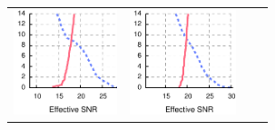 \begin{figure}[p]
\begin{xtrafullpage}
\begin{tabular}{cccc}
	\includegraphics[height=1.2in]{figures/delivery_figures/goodbad/esnr_goodbad_14.pdf} &
	\includegraphics[height=1.2in]{figures/delivery_figures/goodbad/esnr_goodbad_15.pdf} \\


\end{tabular}
\end{xtrafullpage}
\end{figure}
